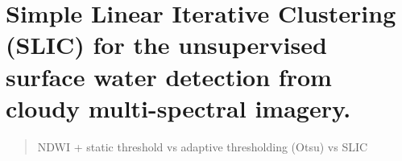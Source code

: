 \chapter{Simple Linear Iterative Clustering (SLIC) for the unsupervised surface water detection from cloudy multi-spectral imagery.}
\label{ch5}

\begin{abstract}
NDWI + static threshold vs adaptive thresholding (Otsu) vs SLIC
\end{abstract}

\newpage
